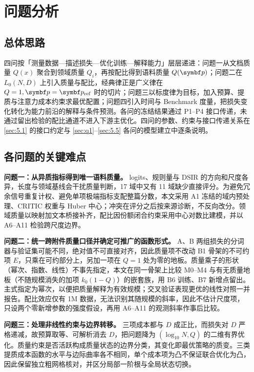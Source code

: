 \section{问题分析}
\label{sec:2}

\subsection{总体思路}
\label{sec:2.1}

四问按「测量数据—描述损失—优化训练—解释能力」层层递进：问题一从文档质量 $Q(x)$ 聚合到领域质量 $Q_i$，再按配比得到语料质量 $Q(\bp)$；问题二在 $L_0(N,D)$ 上引入质量与配比，经典律正是广义律在 $Q=1,\bp=\bp_{\rm ref}$ 时的切片；问题三以标度律为目标，加入预算、提质与注意力成本约束求最优配置；问题四引入时间与 Benchmark 度量，把损失变化转化为能力前沿的解释与条件预测。各问的冻结结果通过 P1–P4 接口传递，未通过留出检验的配比通道不进入下游主优化。四问的参数、约束与接口传递关系在 \ref{sec:5.1} 的接口约定与 \ref{sec:q1}–\ref{sec:5.5} 各问的模型建立中逐条说明。

\subsection{各问题的关键难点}
\label{sec:2.2}

\textbf{问题一：从异质指标得到唯一语料质量。} logits、规则量与 DSIR 的方向和尺度各异，长度与领域基线会干扰质量判断，17 域中又有 11 域缺少直接评分。为避免冗余信号重复计权、避免单项极端指标支配整篇分数，本文采用 A1 冻结的域内预处理、CRITIC 权重与 Huber 中心；冲突在评分之后按来源诊断，不反向改分。领域质量以映射加文本桥接补齐，配比因份额闭合约束采用中心对数比建模，并以 A6–A11 检验跨尺度边界。

\textbf{问题二：统一跨附件质量口径并确定可推广的函数形式。} A、B 两组损失的分词器与验证集可能不同，绝对值不可直接对齐，因此质量项不改动 B1 骨架的不可约项 $E$，只乘在可约部分上，另加一项在 $Q=1$ 处为零的地板。质量乘子的形状（幂次、指数、线性）不事先指定，本文在同一骨架上比较 M0–M4 与有无质量地板（不随规模消失的加项 $k_0(1-Q)$）的嵌套族，用 B6 训练、B7 新增点留出。主式指定为幂次，以便把质量解释为有效规模；交叉验证表现更优的线性对照一并报告。配比效应仅有 1M 数据，无法识别其随规模的斜率，因此不估计尺度项，只设两个零新增参数的强度假设，再用 A6–A11 的观测斜率作事后比较。

\textbf{问题三：处理非线性约束与边界转移。} 三项成本都与 $D$ 成正比，而损失对 $D$ 严格递减，故预算取等、可解析消去 $D$，把问题降为 $(\log_{10}N,Q)$ 的二维有界优化。质量约束是否活跃构成质量状态的边界分类，其变化即最优策略的质变。三类提质成本函数的水平与边际曲率各不相同，单个成本项为凸不保证联合优化为凸，因此保留独立粗网格核对，并区分局部一阶根与全局状态切换。

